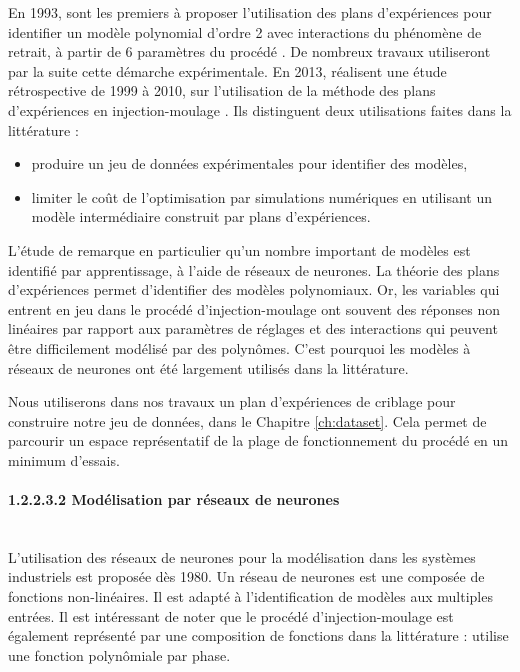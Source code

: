 En 1993, \citeauthor{regnier_local_1993} sont les premiers à proposer l'utilisation des plans d'expériences pour identifier un modèle polynomial d'ordre 2 avec interactions du phénomène de retrait, à partir de 6 paramètres du procédé \cite{regnier_local_1993, regnier_experimental_1994}.
De nombreux travaux utiliseront par la suite cette démarche expérimentale.
En 2013, \citeauthor{fei_practical_2013} réalisent une étude rétrospective de 1999 à 2010, sur l’utilisation de la méthode des plans d'expériences en injection-moulage \cite{fei_practical_2013}.  %
Ils distinguent deux utilisations faites dans la littérature :
\begin{itemize}
	\item produire un jeu de données expérimentales pour identifier des modèles,
	\item limiter le coût de l'optimisation par simulations numériques en utilisant un modèle intermédiaire construit par plans d'expériences.
\end{itemize}

L'étude de \citeauthor{fei_practical_2013} remarque en particulier qu'un nombre important de modèles est identifié par apprentissage, à l'aide de réseaux de neurones.
La théorie des plans d'expériences permet d'identifier des modèles polynomiaux.
Or, les variables qui entrent en jeu dans le procédé d'injection-moulage ont souvent des réponses non linéaires par rapport aux paramètres de réglages et des interactions qui peuvent être difficilement modélisé par des polynômes.
C'est pourquoi les modèles à réseaux de neurones ont été largement utilisés dans la littérature.

Nous utiliserons dans nos travaux un plan d'expériences de criblage pour construire notre jeu de données, dans le Chapitre \ref{ch:dataset}.
Cela permet de parcourir un espace représentatif de la plage de fonctionnement du procédé en un minimum d'essais.

\paragraph{1.2.2.3.2 Modélisation par réseaux de neurones}\mbox{} \label{parag:molding_neural} \\
L'utilisation des réseaux de neurones pour la modélisation dans les systèmes industriels est proposée dès 1980.
Un réseau de neurones est une composée de fonctions non-linéaires.
Il est adapté à l'identification de modèles aux multiples entrées.
Il est intéressant de noter que le procédé d'injection-moulage est également représenté par une composition de fonctions dans la littérature : \citeauthor{ma_design_1974} \cite{ma_design_1974} utilise une fonction polynômiale par phase.

